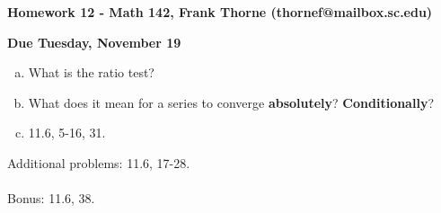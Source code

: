 \documentclass[12pt]{article}
\begin{document}
\setlength{\topmargin}{-2mm}





\begin{center}{\bf Homework 12 - Math 142, Frank Thorne (thornef@mailbox.sc.edu)}
\end{center}
\begin{center}
{\bf Due Tuesday, November 19}
\end{center}
\begin{enumerate}[(a)]


\item
What is the ratio test?

\item
What does it mean for a series to converge {\bf absolutely}? {\bf Conditionally}?

\item
11.6, 5-16, 31.

\end{enumerate}
Additional problems: 11.6, 17-28.
\\
\\
Bonus: 11.6, 38.
\end{document}
